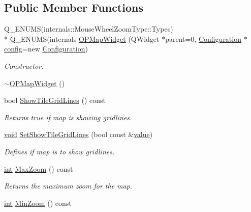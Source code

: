 \subsection*{Public Member Functions}
\begin{DoxyCompactItemize}
\item 
Q\-\_\-\-E\-N\-U\-M\-S(internals\-::\-Mouse\-Wheel\-Zoom\-Type\-::\-Types) \\*
Q\-\_\-\-E\-N\-U\-M\-S(internals \hyperlink{group___o_p_map_widget_ga390f25c0a1e661e1496be4b21c4b4796}{O\-P\-Map\-Widget} (Q\-Widget $\ast$parent=0, \hyperlink{classmapcontrol_1_1_configuration}{Configuration} $\ast$\hyperlink{deflate_8c_a4473b5227787415097004fd39f55185e}{config}=new \hyperlink{classmapcontrol_1_1_configuration}{Configuration})
\begin{DoxyCompactList}\small\item\em Constructor. \end{DoxyCompactList}\item 
\hyperlink{group___o_p_map_widget_gabdcfea44244e345b2e4c966cc8d8c3c6}{$\sim$\-O\-P\-Map\-Widget} ()
\item 
bool \hyperlink{group___o_p_map_widget_ga206c68521bc221bc6db0e63e187c4481}{Show\-Tile\-Grid\-Lines} () const 
\begin{DoxyCompactList}\small\item\em Returns true if map is showing gridlines. \end{DoxyCompactList}\item 
\hyperlink{group___u_a_v_objects_plugin_ga444cf2ff3f0ecbe028adce838d373f5c}{void} \hyperlink{group___o_p_map_widget_gae09f73466c8f5ba738db48600eab7635}{Set\-Show\-Tile\-Grid\-Lines} (bool const \&\hyperlink{glext_8h_aa0e2e9cea7f208d28acda0480144beb0}{value})
\begin{DoxyCompactList}\small\item\em Defines if map is to show gridlines. \end{DoxyCompactList}\item 
\hyperlink{ioapi_8h_a787fa3cf048117ba7123753c1e74fcd6}{int} \hyperlink{group___o_p_map_widget_ga20e653fc57f65044824fd9697d9111a8}{Max\-Zoom} () const 
\begin{DoxyCompactList}\small\item\em Returns the maximum zoom for the map. \end{DoxyCompactList}\item 
\hyperlink{ioapi_8h_a787fa3cf048117ba7123753c1e74fcd6}{int} \hyperlink{group___o_p_map_widget_ga331965564954b53f6fa29812ae5c8f4b}{Min\-Zoom} () const 

\end{DoxyCompactItemize}
